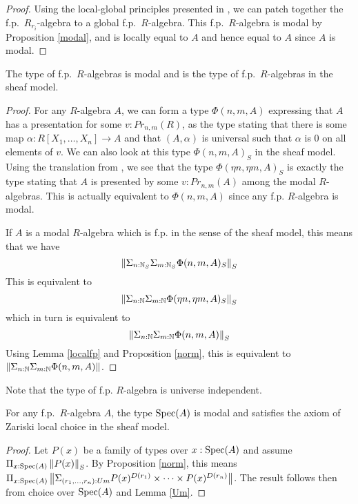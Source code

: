     \begin{proof}
      Using the local-global principles presented in \cite{lombardi-quitte}, we can patch together the f.p.\ $R_{r_i}$-algebra
      to a global f.p.\ $R$-algebra. This f.p.\ $R$-algebra is modal by Proposition \ref{modal}, and is locally equal to $A$
      and hence equal to $A$ since $A$ is modal.
    \end{proof}

    \begin{corollary}
      The type of f.p.\ $R$-algebras is modal and is the type of f.p.\ $R$-algebras in the sheaf model.
    \end{corollary}

    \begin{proof}
          For any $R$-algebra $A$, we can form a type $\Phi(n,m,A)$ expressing that $A$ has a presentation for some $v:Pr_{n,m}(R)$,
    as the type stating that there is some map $\alpha:R[X_1,\dots,X_n]\rightarrow A$ and that $(A,\alpha)$ is universal such that
    $\alpha$ is $0$ on all elements of $v$. We can also look at this type $\Phi(n,m,A)_S$ in the sheaf model. Using the translation
    from \cite{Quirin16,CRS21}, we see that the type $\Phi(\eta n,\eta m,A)_S$ is exactly the type stating that $A$ is presented by
    some $v:Pr_{n,m}(A)$ among the modal $R$-algebras. This is actually equivalent to $\Phi(n,m,A)$ since any f.p. $R$-algebra is modal.

     If $A$ is a modal $R$-algebra which is f.p. in the sense of the sheaf model, this means that we have
     $$\left\lVert \Sigma_{n:\mathbb{N}_S}\Sigma_{m:\mathbb{N}_S}\Phi(n,m,A)_S \right\rVert_S$$
     This is equivalent to
     $$\left\lVert \Sigma_{n:\mathbb{N}}\Sigma_{m:\mathbb{N}}\Phi(\eta n,\eta m,A)_S \right\rVert_S$$
     which in turn is equivalent to
     $$\left\lVert \Sigma_{n:\mathbb{N}}\Sigma_{m:\mathbb{N}}\Phi(n,m,A) \right\rVert_S$$
     Using Lemma \ref{localfp} and Proposition \ref{norm}, this is equivalent to $\left\lVert \Sigma_{n:\mathbb{N}}\Sigma_{m:\mathbb{N}}\Phi(n,m,A) \right\rVert$.
    \end{proof}

     Note that the type of f.p. $R$-algebra is universe independent.

    \begin{proposition}
      For any f.p.\ $R$-algebra $A$, the type $\operatorname{Spec}(A)$ is modal and satisfies the axiom of Zariski local choice in
      the sheaf model.
    \end{proposition}
    
    \begin{proof}
      Let $P(x)$ be a family of types over $x:\operatorname{Spec}(A)$ and assume $\Pi_{x:\operatorname{Spec}(A)}\left\lVert P(x) \right\rVert_S$. By Proposition \ref{norm},
      this means $\Pi_{x:\operatorname{Spec}(A)}\left\lVert \Sigma_{(r_1,\dots,r_n):Um}P(x)^{D(r_1)}\times\dots\times P(x)^{D(r_n)} \right\rVert$. The result follows
      then from choice over $\operatorname{Spec}(A)$ and Lemma \ref{Um}.
    \end{proof}      

